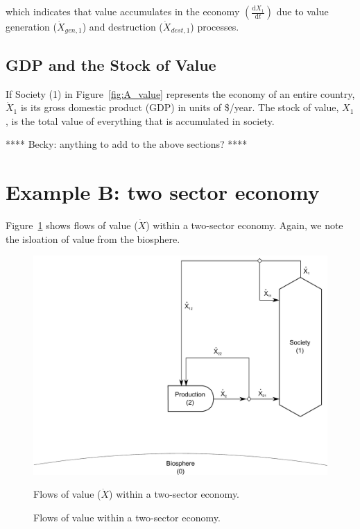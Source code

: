 \noindent which indicates that value accumulates in the economy
$\left( \frac{\mathrm{d}X_{1}}{\mathrm{d}t} \right)$
due to value generation ($\dot{X}_{gen,1}$) 
and destruction ($\dot{X}_{dest,1}$) processes.


\subsection{GDP and the Stock of Value}

If Society (1) in Figure~\ref{fig:A_value} represents 
the economy of an entire country, 
$\dot{X}_{1}$ is its gross domestic product (GDP)
in units of \$/year.
The stock of value, $X_1$, is the total value of everything that 
is accumulated in society.

**** Becky: anything to add to the above sections? ****


\section{Example B: two sector economy}

Figure~\ref{fig:B_value} shows flows of value ($\dot{X}$) 
within a two-sector economy. 
Again, we note the isloation of value from the biosphere.

\begin{figure}[!ht]
\centering
\includegraphics[width=0.8\linewidth]{Part_3/Chapter_Values/images/2_sector_value.pdf}
\caption{Flows of value within a two-sector economy.}{Flows of value ($\dot{X}$) within a two-sector economy.}
\label{fig:B_value}
\end{figure}

